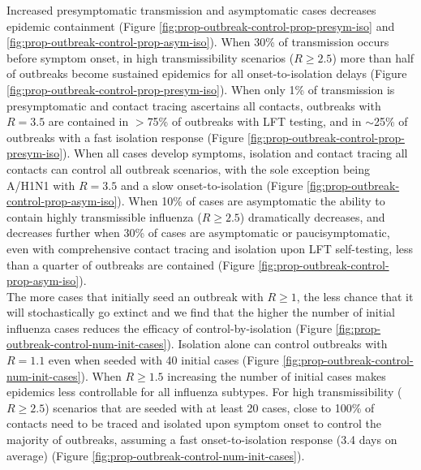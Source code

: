 \documentclass{article}
\begin{document}
Increased presymptomatic transmission and asymptomatic cases decreases epidemic containment (Figure \ref{fig:prop-outbreak-control-prop-presym-iso} and \ref{fig:prop-outbreak-control-prop-asym-iso}). When 30\% of transmission occurs before symptom onset, in high transmissibility scenarios ($R \geq 2.5$) more than half of outbreaks become sustained epidemics for all onset-to-isolation delays (Figure \ref{fig:prop-outbreak-control-prop-presym-iso}). When only 1\% of transmission is presymptomatic and contact tracing ascertains all contacts, outbreaks with $R = 3.5$ are contained in $>$75\% of outbreaks with LFT testing, and in $\sim$25\% of outbreaks with a fast isolation response (Figure \ref{fig:prop-outbreak-control-prop-presym-iso}). When all cases develop symptoms, isolation and contact tracing all contacts can control all outbreak scenarios, with the sole exception being A/H1N1 with $R = 3.5$ and a slow onset-to-isolation (Figure \ref{fig:prop-outbreak-control-prop-asym-iso}). When 10\% of cases are asymptomatic the ability to contain highly transmissible influenza ($R \geq 2.5$) dramatically decreases, and decreases further when 30\% of cases are asymptomatic or paucisymptomatic, even with comprehensive contact tracing and isolation upon LFT self-testing, less than a quarter of outbreaks are contained (Figure \ref{fig:prop-outbreak-control-prop-asym-iso}). \\

The more cases that initially seed an outbreak with $R \geq 1$, the less chance that it will stochastically go extinct and we find that the higher the number of initial influenza cases reduces the efficacy of control-by-isolation (Figure \ref{fig:prop-outbreak-control-num-init-cases}). Isolation alone can control outbreaks with $R = 1.1$ even when seeded with 40 initial cases (Figure \ref{fig:prop-outbreak-control-num-init-cases}). When $R \geq 1.5$ increasing the number of initial cases makes epidemics less controllable for all influenza subtypes. For high transmissibility ($R \geq 2.5$) scenarios that are seeded with at least 20 cases, close to 100\% of contacts need to be traced and isolated upon symptom onset to control the majority of outbreaks, assuming a fast onset-to-isolation response (3.4 days on average) (Figure \ref{fig:prop-outbreak-control-num-init-cases}). \\
\end{document}
